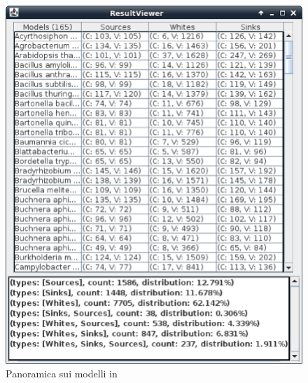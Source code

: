 \begin{figure}
  \centering
  \includegraphics[scale=.7]{images/ResultViewer-MetExplore-models-overview}
  \caption{Panoramica sui modelli in \cite{MetExplore}}
  \label{fig:ResultViewer-MetExplore-models-overview}
\end{figure}


